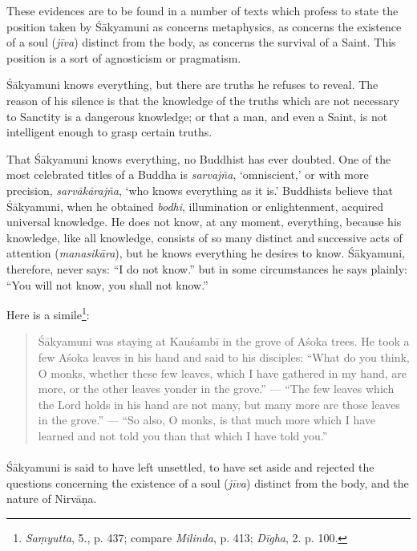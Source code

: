 \documentclass[a4paper, 11pt, oneside, english, landscape]{article}
\begin{document}
These evidences are to be found in a number of texts which profess to state the position taken by Śākyamuni as concerns metaphysics, as concerns the existence of a soul (\emph{jīva}) distinct from the body, as concerns the survival of a Saint. This position is a sort of agnosticism or pragmatism.

Śākyamuni knows everything, but there are truths he refuses to reveal. The reason of his silence is that the knowledge of the truths which are not necessary to Sanctity is a dangerous knowledge; or that a man, and even a Saint, is not intelligent enough to grasp certain truths.

That Śākyamuni knows everything, no Buddhist has ever doubted. One of the most celebrated titles of a Buddha is \emph{sarvajña}, `omniscient,' or with more precision, \emph{sarvākārajña}, `who knows everything as it is.' Buddhists believe that Śākyamuni, when he obtained \emph{bodhi}, illumination or enlightenment, acquired universal knowledge. He does not know, at any moment, everything, because his knowledge, like all knowledge, consists of so many distinct and successive acts of attention (\emph{manasikāra}), but he knows everything he desires to know. Śākyamuni, therefore, never says: ``I do not know.'' but in some circumstances he says plainly: ``You will not know, you shall not know.''

Here is a simile\footnote{\emph{Saṃyutta}, 5., p. 437; compare \emph{Milinda}, p. 413; \emph{Dīgha}, 2. p. 100.}:
\begin{quotation}
\small
Śākyamuni was staying at Kauśambī in the grove of Aśoka trees. He took a few Aśoka leaves in his hand and said to his disciples: ``What do you think, O monks, whether these few leaves, which I have gathered in my hand, are more, or the other leaves yonder in the grove.'' --- ``The few leaves which the Lord holds in his hand are not many, but many more are those leaves in the grove.'' --- ``So also, O monks, is that much more which I have learned and not told you than that which I have told you.''
\end{quotation}
\paragraph{}
Śākyamuni is said to have left unsettled, to have set aside and rejected the questions concerning the existence of a soul (\emph{jīva}) distinct from the body, and the nature of Nirvāṇa.
\end{document}
